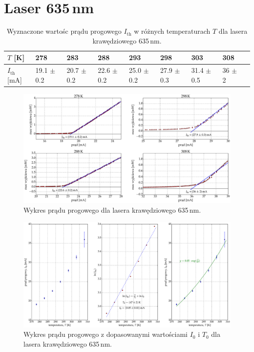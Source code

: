 \section{Laser 635\,nm}
\begin{table}
\begin{center}
\caption{ Wyznaczone wartośc prądu progowego $I_{\mathrm{th}}$ w różnych temperaturach $T$ dla lasera krawędziowego 635\,nm. }
\begin{tabular}{ | C{1.5cm}|  C{1.5cm} | C{1.5cm} | C{1.5cm}| C{1.5cm} | C{1.5cm}| C{1.5cm}| C{2.0cm}| C{2.0cm}|}
\hline
$T$ [K] 	&   278 & 283  	& 288 & 293 & 298 & 303 & 308 \\ \hline
$I_{\mathrm{th}}$ [mA]  &	19.1 $\pm$ 0.2  & 20.7 $\pm$ 0.2 & 22.6 $\pm$ 0.2 &
25.0 $\pm$ 0.2  & 27.9 $\pm$ 0.3 & 31.4 $\pm$ 0.5 & 36 $\pm$ 2	\\ \hline
\end{tabular}
\end{center}
\end{table}
\begin{figure}
\center
  \includegraphics[scale=0.30]{plot635/plot_i_th_4.eps}
  \caption{Wykres prądu progowego dla lasera krawędziowego 635\,nm.}
  \label{fig:plot_i_th_4}
\end{figure}
\begin{figure}
\center
  \includegraphics[scale=0.30]{plot635/plot_fit.eps}
  \caption{Wykres prądu progowego z dopasowanymi wartościami $I_{0}$ i $T_{0}$ dla lasera krawędziowego 635\,nm.}
  \label{fig:plot_fit}
\end{figure}
